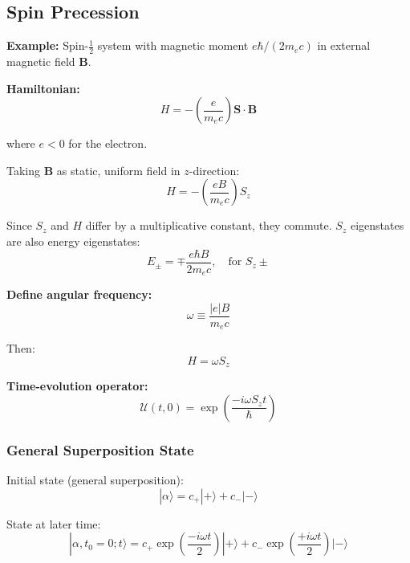 \documentclass[11pt,a4paper]{article}
\begin{document}
\subsection{Spin Precession}

\textbf{Example:} Spin-$\frac{1}{2}$ system with magnetic moment $e\hbar/(2m_ec)$ in external magnetic field $\mathbf{B}$.

\textbf{Hamiltonian:}
\begin{equation}
H = -\left(\frac{e}{m_ec}\right)\mathbf{S} \cdot \mathbf{B}
\tag{2.49}
\end{equation}

where $e < 0$ for the electron.

Taking $\mathbf{B}$ as static, uniform field in $z$-direction:
\begin{equation}
H = -\left(\frac{eB}{m_ec}\right)S_z
\tag{2.50}
\end{equation}

Since $S_z$ and $H$ differ by a multiplicative constant, they commute. $S_z$ eigenstates are also energy eigenstates:
\begin{equation}
E_{\pm} = \mp \frac{e\hbar B}{2m_ec}, \quad \text{for } S_z\pm
\tag{2.51}
\end{equation}

\textbf{Define angular frequency:}
\begin{equation}
\omega \equiv \frac{|e|B}{m_ec}
\tag{2.52}
\end{equation}

Then:
\begin{equation}
H = \omega S_z
\tag{2.53}
\end{equation}

\textbf{Time-evolution operator:}
\begin{equation}
\mathscr{U}(t, 0) = \exp\left(\frac{-i\omega S_z t}{\hbar}\right)
\tag{2.54}
\end{equation}

\subsubsection{General Superposition State}

Initial state (general superposition):
\begin{equation}
|\alpha\rangle = c_+|+\rangle + c_-|-\rangle
\tag{2.55}
\end{equation}

State at later time:
\begin{equation}
|\alpha, t_0 = 0; t\rangle = c_+\exp\left(\frac{-i\omega t}{2}\right)|+\rangle + c_-\exp\left(\frac{+i\omega t}{2}\right)|-\rangle
\tag{2.56}
\end{equation}
\end{document}
